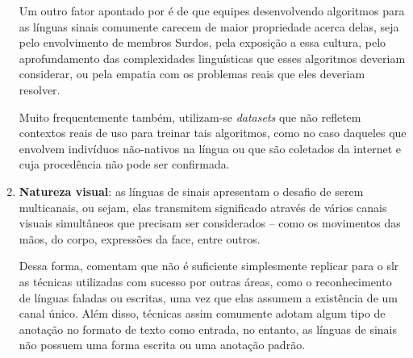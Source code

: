 \begin{enumerate}
            Um outro fator apontado por  é de que equipes desenvolvendo algoritmos para as línguas sinais comumente carecem de maior propriedade acerca delas, seja pelo envolvimento de membros Surdos, pela exposição a essa cultura, pelo aprofundamento das complexidades linguísticas que esses algoritmos deveriam considerar, ou pela empatia com os problemas reais que eles deveriam resolver.

            Muito frequentemente também, utilizam-se \textit{datasets} que não refletem contextos reais de uso para treinar tais algoritmos, como no caso daqueles que envolvem indivíduos não-nativos na língua ou que são coletados da internet e cuja procedência não pode ser confirmada.





      \item \textbf{Natureza visual}:
            as línguas de sinais apresentam o desafio de serem multicanais, ou sejam, elas transmitem significado através de vários canais visuais simultâneos que precisam ser considerados -- como os movimentos das mãos, do corpo, expressões da face, entre outros.


            Dessa forma,  comentam que não é suficiente simplesmente replicar para o \acrshort{slr} as técnicas utilizadas com sucesso por outras áreas, como o reconhecimento de línguas faladas ou escritas, uma vez que elas assumem a existência de um canal único.
            Além disso, técnicas assim comumente adotam algum tipo de anotação no formato de texto como entrada, no entanto, as línguas de sinais não possuem uma forma escrita ou uma anotação padrão.


\end{enumerate}
